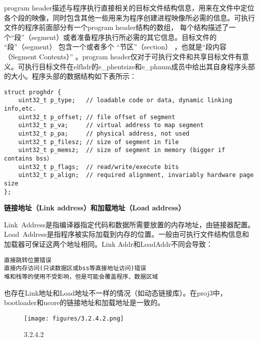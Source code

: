 program
header描述与程序执行直接相关的目标文件结构信息，用来在文件中定位各个段的映像，同时包含其他一些用来为程序创建进程映像所必需的信息。可执行文件的程序前面部分有一个program
header结构的数组，
每个结构描述了一个``段''（segment）或者准备程序执行所必需的其它信息。目标文件的
``段''（segment） 包含一个或者多个 ``节区''（section）
，也就是``段内容（Segment Contents）'' 。program
header仅对于可执行文件和共享目标文件有意义。可执行目标文件在elfhdr的e\_phentsize和e\_phnum成员中给出其自身程序头部的大小。程序头部的数据结构如下表所示：

\begin{lstlisting}
struct proghdr {
    uint32_t p_type;   // loadable code or data, dynamic linking info,etc.
    uint32_t p_offset; // file offset of segment
    uint32_t p_va;     // virtual address to map segment
    uint32_t p_pa;     // physical address, not used
    uint32_t p_filesz; // size of segment in file
    uint32_t p_memsz;  // size of segment in memory (bigger if contains bss）
    uint32_t p_flags;  // read/write/execute bits
    uint32_t p_align;  // required alignment, invariably hardware page size
};
\end{lstlisting}

\textbf{链接地址（Link address）和加载地址（Load address）}

Link~Address是指编译器指定代码和数据所需要放置的内存地址，由链接器配置。Load~Address是指程序被实际加载到内存的位置。一般由可执行文件结构信息和加载器可保证这两个地址相同。Link
Addr和LoadAddr不同会导致：

\begin{lstlisting}
直接跳转位置错误
直接内存访问(只读数据区或bss等直接地址访问)错误
堆和栈等的使用不受影响，但是可能会覆盖程序、数据区域
\end{lstlisting}

也存在Link地址和Load地址不一样的情况（如动态链接库）。在proj3中，bootloader和ucore的链接地址和加载地址是一致的。

\begin{figure}[htbp]
\centering
\texttt{[image: figures/3.2.4.2.png]}
\caption{3.2.4.2}
\end{figure}
